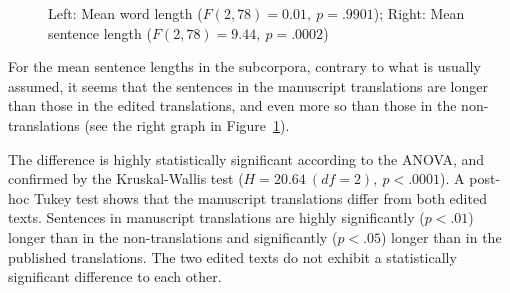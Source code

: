 \documentclass[output=paper]{LSP/langsci}
\begin{document}
\begin{figure}
  \begin{minipage}{0.5\textwidth}
    \end{minipage}%
    \begin{minipage}{0.5\textwidth}%
  \end{minipage}
  \caption{Left: Mean word length ($F(2,78)=0.01,~p=.9901$); Right: Mean sentence length ($F(2,78)=9.44,~p=.0002$)}\label{bisiada:fig:mwsl}
\end{figure}

\noindent For the mean sentence lengths in the subcorpora, contrary to what is usually assumed, it seems that the sentences in the manuscript translations are longer than those in the edited translations, and even more so than those in the non-translations (see the right graph in Figure~\ref{bisiada:fig:mwsl}).

The difference is highly statistically significant according to the ANOVA, and confirmed by the Kruskal-Wallis test ($H=20.64~(df=2),~p<.0001$). A post-hoc Tukey test shows that the manuscript translations differ from both edited texts. Sentences in manuscript translations are highly significantly ($p<.01$) longer than in the non-translations and significantly ($p<.05$) longer than in the published translations. The two edited texts do not exhibit a statistically significant difference to each other.
\end{document}

